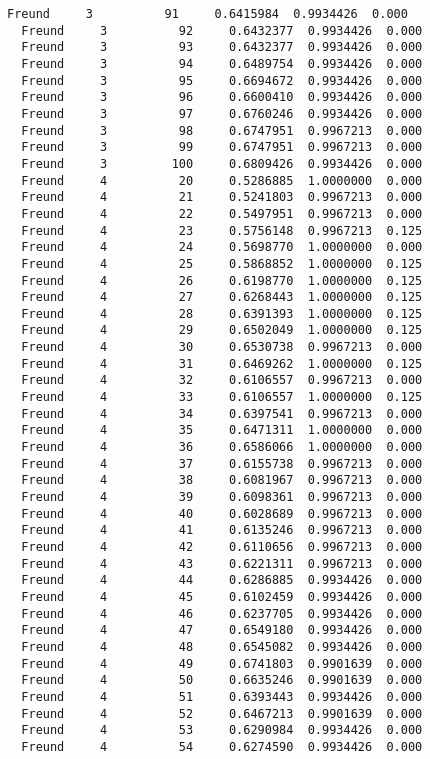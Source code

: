 \documentclass[11pt]{article}
\begin{document}
\begin{Verbatim}[commandchars=\\\{\}]
  Freund     3          91     0.6415984  0.9934426  0.000
  Freund     3          92     0.6432377  0.9934426  0.000
  Freund     3          93     0.6432377  0.9934426  0.000
  Freund     3          94     0.6489754  0.9934426  0.000
  Freund     3          95     0.6694672  0.9934426  0.000
  Freund     3          96     0.6600410  0.9934426  0.000
  Freund     3          97     0.6760246  0.9934426  0.000
  Freund     3          98     0.6747951  0.9967213  0.000
  Freund     3          99     0.6747951  0.9967213  0.000
  Freund     3         100     0.6809426  0.9934426  0.000
  Freund     4          20     0.5286885  1.0000000  0.000
  Freund     4          21     0.5241803  0.9967213  0.000
  Freund     4          22     0.5497951  0.9967213  0.000
  Freund     4          23     0.5756148  0.9967213  0.125
  Freund     4          24     0.5698770  1.0000000  0.000
  Freund     4          25     0.5868852  1.0000000  0.125
  Freund     4          26     0.6198770  1.0000000  0.125
  Freund     4          27     0.6268443  1.0000000  0.125
  Freund     4          28     0.6391393  1.0000000  0.125
  Freund     4          29     0.6502049  1.0000000  0.125
  Freund     4          30     0.6530738  0.9967213  0.000
  Freund     4          31     0.6469262  1.0000000  0.125
  Freund     4          32     0.6106557  0.9967213  0.000
  Freund     4          33     0.6106557  1.0000000  0.125
  Freund     4          34     0.6397541  0.9967213  0.000
  Freund     4          35     0.6471311  1.0000000  0.000
  Freund     4          36     0.6586066  1.0000000  0.000
  Freund     4          37     0.6155738  0.9967213  0.000
  Freund     4          38     0.6081967  0.9967213  0.000
  Freund     4          39     0.6098361  0.9967213  0.000
  Freund     4          40     0.6028689  0.9967213  0.000
  Freund     4          41     0.6135246  0.9967213  0.000
  Freund     4          42     0.6110656  0.9967213  0.000
  Freund     4          43     0.6221311  0.9967213  0.000
  Freund     4          44     0.6286885  0.9934426  0.000
  Freund     4          45     0.6102459  0.9934426  0.000
  Freund     4          46     0.6237705  0.9934426  0.000
  Freund     4          47     0.6549180  0.9934426  0.000
  Freund     4          48     0.6545082  0.9934426  0.000
  Freund     4          49     0.6741803  0.9901639  0.000
  Freund     4          50     0.6635246  0.9901639  0.000
  Freund     4          51     0.6393443  0.9934426  0.000
  Freund     4          52     0.6467213  0.9901639  0.000
  Freund     4          53     0.6290984  0.9934426  0.000
  Freund     4          54     0.6274590  0.9934426  0.000

\end{Verbatim}
\end{document}
